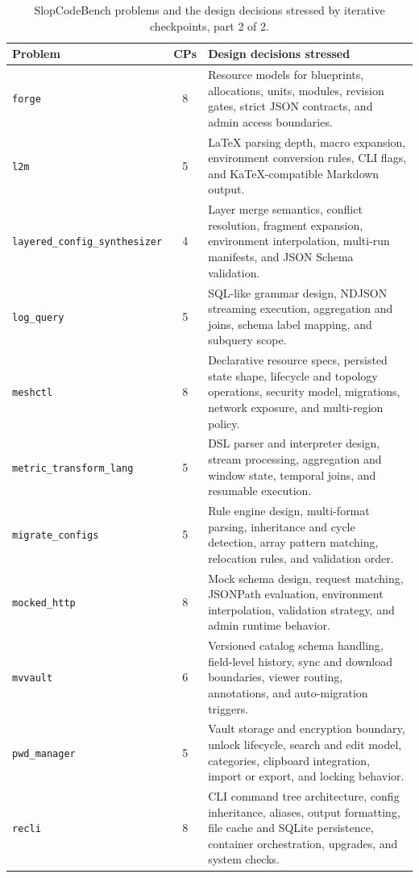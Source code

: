 \begin{table}[t]
\centering
\caption{SlopCodeBench problems and the design decisions stressed by iterative checkpoints, part 2 of 2.}
\label{tab:problem-design-decisions-b}
\scriptsize
\setlength{\tabcolsep}{4pt}
\renewcommand{\arraystretch}{1.08}
\begin{tabularx}{\textwidth}{@{}l c >{\raggedright\arraybackslash}X@{}}
\toprule
Problem & CPs & Design decisions stressed \\
\midrule
\texttt{forge} & 8 & Resource models for blueprints, allocations, units, modules, revision gates, strict JSON contracts, and admin access boundaries. \\
\texttt{l2m} & 5 & LaTeX parsing depth, macro expansion, environment conversion rules, CLI flags, and KaTeX-compatible Markdown output. \\
\texttt{layered\_config\_synthesizer} & 4 & Layer merge semantics, conflict resolution, fragment expansion, environment interpolation, multi-run manifests, and JSON Schema validation. \\
\texttt{log\_query} & 5 & SQL-like grammar design, NDJSON streaming execution, aggregation and joins, schema label mapping, and subquery scope. \\
\texttt{meshctl} & 8 & Declarative resource specs, persisted state shape, lifecycle and topology operations, security model, migrations, network exposure, and multi-region policy. \\
\texttt{metric\_transform\_lang} & 5 & DSL parser and interpreter design, stream processing, aggregation and window state, temporal joins, and resumable execution. \\
\texttt{migrate\_configs} & 5 & Rule engine design, multi-format parsing, inheritance and cycle detection, array pattern matching, relocation rules, and validation order. \\
\texttt{mocked\_http} & 8 & Mock schema design, request matching, JSONPath evaluation, environment interpolation, validation strategy, and admin runtime behavior. \\
\texttt{mvvault} & 6 & Versioned catalog schema handling, field-level history, sync and download boundaries, viewer routing, annotations, and auto-migration triggers. \\
\texttt{pwd\_manager} & 5 & Vault storage and encryption boundary, unlock lifecycle, search and edit model, categories, clipboard integration, import or export, and locking behavior. \\
\texttt{recli} & 8 & CLI command tree architecture, config inheritance, aliases, output formatting, file cache and SQLite persistence, container orchestration, upgrades, and system checks. \\

\end{tabularx}
\end{table}

